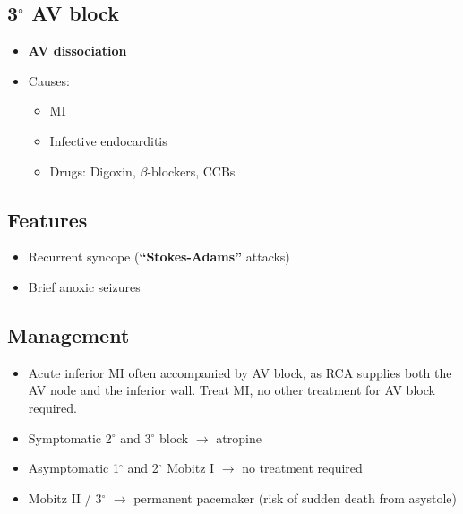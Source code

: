 \documentclass[
  12pt,
]{memoir}
\providecommand{\tightlist}{%
  \setlength{\itemsep}{0pt}\setlength{\parskip}{0pt}}
\begin{document}
\hypertarget{circ-av-block-2}{%
\subsection{\texorpdfstring{3\(^\circ\) AV
block}{3\^{}\textbackslash circ AV block}}\label{circ-av-block-2}}

\begin{itemize}
\tightlist
\item
  \textbf{AV dissociation}
\item
  Causes:

  \begin{itemize}
  \tightlist
  \item
    MI
  \item
    Infective endocarditis
  \item
    Drugs: Digoxin, \(\beta\)-blockers, CCBs
  \end{itemize}
\end{itemize}

\hypertarget{features}{%
\subsection{Features}\label{features}}

\begin{itemize}
\tightlist
\item
  Recurrent syncope (\textbf{``Stokes-Adams''} attacks)
\item
  Brief anoxic seizures
\end{itemize}

\hypertarget{management-2}{%
\subsection{Management}\label{management-2}}

\begin{itemize}
\tightlist
\item
  Acute inferior MI often accompanied by AV block, as RCA supplies both
  the AV node and the inferior wall. Treat MI, no other treatment for AV
  block required.
\item
  Symptomatic 2\(^\circ\) and 3\(^\circ\) block \(\rightarrow\) atropine
\item
  Asymptomatic 1\(^\circ\) and 2\(^\circ\) Mobitz I \(\rightarrow\) no
  treatment required
\item
  Mobitz II / 3\(^\circ\) \(\rightarrow\) permanent pacemaker (risk of
  sudden death from asystole)
\end{itemize}
\end{document}
